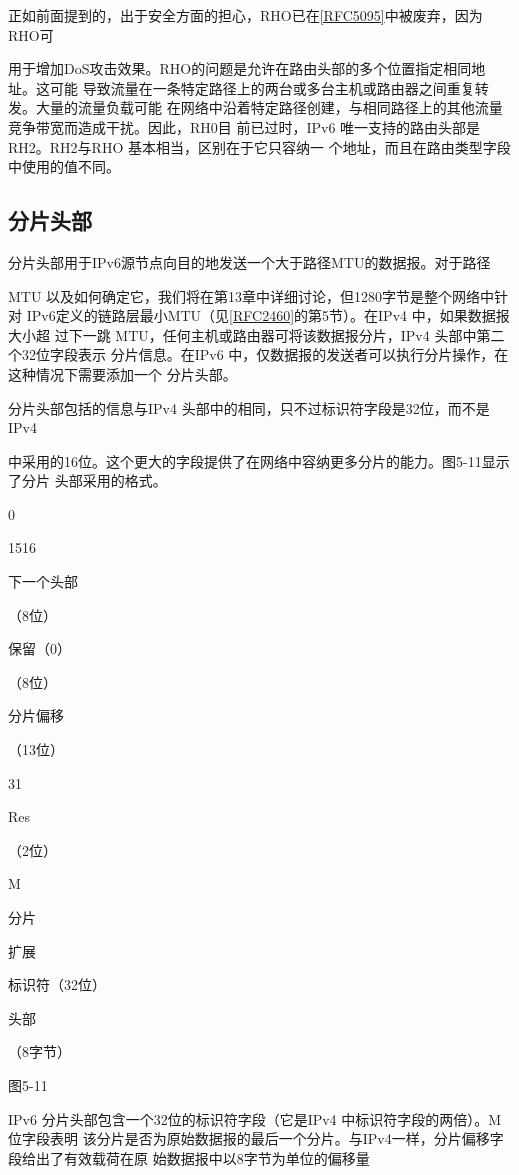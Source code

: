 正如前面提到的，出于安全方面的担心，RHO已在\href{https://www.rfc-editor.org/rfc/rfc5095}{[RFC5095]}中被废弃，因为RHO可

用于增加DoS攻击效果。RHO的问题是允许在路由头部的多个位置指定相同地址。这可能
导致流量在一条特定路径上的两台或多台主机或路由器之间重复转发。大量的流量负载可能
在网络中沿着特定路径创建，与相同路径上的其他流量竞争带宽而造成干扰。因此，RH0目
前已过时，IPv6 唯一支持的路由头部是RH2。RH2与RHO 基本相当，区别在于它只容纳一
个地址，而且在路由类型字段中使用的值不同。

\subsection{分片头部}
分片头部用于IPv6源节点向目的地发送一个大于路径MTU的数据报。对于路径

MTU 以及如何确定它，我们将在第13章中详细讨论，但1280字节是整个网络中针对
IPv6定义的链路层最小MTU（见\href{https://www.rfc-editor.org/rfc/rfc2460}{[RFC2460]}的第5节）。在IPv4 中，如果数据报大小超
过下一跳 MTU，任何主机或路由器可将该数据报分片，IPv4 头部中第二个32位字段表示
分片信息。在IPv6 中，仅数据报的发送者可以执行分片操作，在这种情况下需要添加一个
分片头部。

分片头部包括的信息与IPv4 头部中的相同，只不过标识符字段是32位，而不是IPv4

中采用的16位。这个更大的字段提供了在网络中容纳更多分片的能力。图5-11显示了分片
头部采用的格式。

0

1516

下一个头部

（8位）

保留（0）

（8位）

分片偏移

（13位）

31

Res

（2位）

M

分片

扩展

标识符（32位）

头部

（8字节）

图5-11

IPv6 分片头部包含一个32位的标识符字段（它是IPv4 中标识符字段的两倍）。M位字段表明
该分片是否为原始数据报的最后一个分片。与IPv4一样，分片偏移字段给出了有效载荷在原
始数据报中以8字节为单位的偏移量

